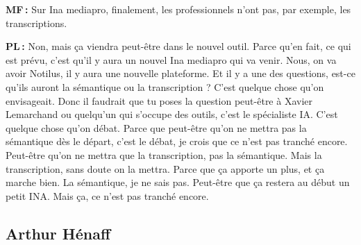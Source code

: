 \textbf{MF :} Sur Ina mediapro, finalement, les professionnels n'ont pas, par exemple, les transcriptions. 

\textbf{PL :} Non, mais ça viendra peut-être dans le nouvel outil. Parce qu'en fait, ce qui est prévu, c'est qu'il y aura un nouvel Ina mediapro qui va venir. Nous, on va avoir Notilus, il y aura une nouvelle plateforme. Et il y a une des questions, est-ce qu'ils auront la sémantique ou la transcription ? C'est quelque chose qu'on envisageait. Donc il faudrait que tu poses la question peut-être à Xavier Lemarchand ou quelqu'un qui s'occupe des outils, c'est le spécialiste IA.  C’est quelque chose qu'on débat. Parce que peut-être qu'on ne mettra pas la sémantique dès le départ, c'est le débat, je crois que ce n'est pas tranché encore. Peut-être qu'on ne mettra que la transcription, pas la sémantique. Mais la transcription, sans doute on la mettra. Parce que ça apporte un plus, et ça marche bien. La sémantique, je ne sais pas.  Peut-être que ça restera au début un petit INA. Mais ça, ce n'est pas tranché encore. 

\subsection*{Arthur Hénaff} 

